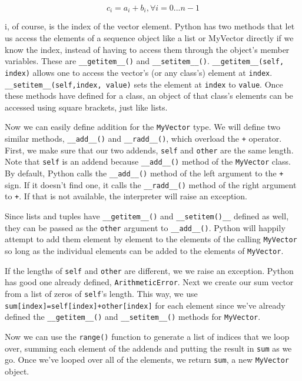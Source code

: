 \begin{displaymath}
c_i = a_i+b_i, \forall i=0...n-1
\end{displaymath}

i, of course, is the index of the vector element. Python has two methods that let us access the elements of a sequence object like a list or MyVector directly if we know the index, instead of having to access them through the object's member variables. These are \verb|__getitem__()| and \verb|__setitem__()|. \verb|__getitem__(self, index)| allows one to access the vector's (or any class's) element at \verb|index|. \verb|__setitem__(self,index, value)| sets the element at \verb|index| to \verb|value|.  Once these methods have defined for a class, an object of that class's elements can be accessed using square brackets, just like lists.

Now we can easily define addition for the \verb|MyVector| type. We will define two similar methods, \verb|__add__()| and \verb|__radd__()|, which overload the \verb|+| operator. First, we make sure that our two addends, \verb|self| and \verb|other| are the same length. Note that \verb|self| is an addend because \verb|__add__()| method of the \verb|MyVector| class. By default, Python calls the \verb|__add__()| method of the left argument to the \verb|+| sign. If it doesn't find one, it calls the \verb|__radd__()| method of the right argument to \verb|+|. If that is not available, the interpreter will raise an exception.

Since lists and tuples have \verb|__getitem__()| and \verb|__setitem()__| defined as well, they  can be passed as the \verb|other| argument to \verb|__add__()|. Python will happily attempt to add them element by element to the elements of the calling \verb|MyVector| so long as the individual elements can be added to the elements of \verb|MyVector|.

If the lengths of \verb|self| and \verb|other| are different, we we raise an exception. Python has good one already defined, \verb|ArithmeticError|. Next we create our sum vector from a list of zeros of \verb|self|'s length. This way, we use \verb|sum[index]=self[index]+other[index]| for each element since we've already defined the \verb|__getitem__()| and \verb|__setitem__()| methods for \verb|MyVector|.

Now we can use the \verb|range()| function to generate a list of indices that we loop over, summing each element of the addends and putting the result in \verb|sum| as we go. Once we've looped over all of the elements, we return \verb|sum|, a new \verb|MyVector| object.

